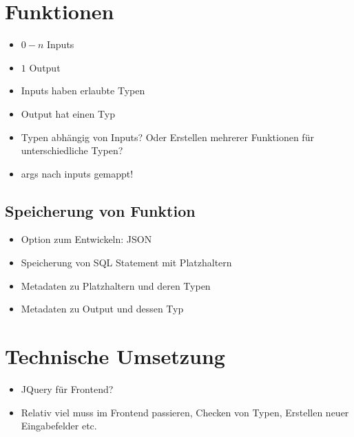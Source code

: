 \section*{Funktionen}
\begin{itemize}
  \item $0-n$ Inputs
  \item $1$ Output
  \item Inputs haben erlaubte Typen
  \item Output hat einen Typ
  \item Typen abhängig von Inputs? Oder Erstellen mehrerer Funktionen für unterschiedliche Typen?
  \item args nach inputs gemappt!
\end{itemize}

\subsection*{Speicherung von Funktion}
\begin{itemize}
  \item Option zum Entwickeln: JSON
  \item Speicherung von SQL Statement mit Platzhaltern
  \item Metadaten zu Platzhaltern und deren Typen
  \item Metadaten zu Output und dessen Typ
\end{itemize}

\section*{Technische Umsetzung}
\begin{itemize}
  \item JQuery für Frontend?
  \item Relativ viel muss im Frontend passieren, Checken von Typen, Erstellen neuer Eingabefelder etc.
\end{itemize}
